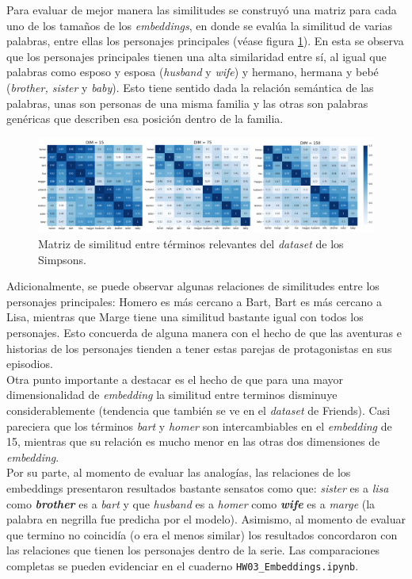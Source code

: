 Para evaluar de mejor manera las similitudes se construyó una matriz para cada uno de los tamaños de los \textit{embeddings}, en donde se evalúa la similitud de varias palabras, entre ellas los personajes principales (véase figura \ref{fig:simpsons_sim_matrix}). En esta se observa que los personajes principales tienen una alta similaridad entre sí, al igual que palabras como esposo y esposa (\textit{husband} y \textit{wife}) y hermano, hermana y bebé (\textit{brother, sister} y \textit{baby}). Esto tiene sentido dada la relación semántica de las palabras, unas son personas de una misma familia y las otras son palabras genéricas que describen esa posición dentro de la familia. 

\begin{figure}[H]
    \centering
    \includegraphics[width=\textwidth]{doc/images/simpsons_sim_matrix.png}
    \caption{Matriz de similitud entre términos relevantes del \textit{dataset} de los Simpsons.}
    \label{fig:simpsons_sim_matrix}
\end{figure}

Adicionalmente, se puede observar algunas relaciones de similitudes entre los personajes principales: Homero es más cercano a Bart, Bart es más cercano a Lisa, mientras que Marge tiene una similitud bastante igual con todos los personajes. Esto concuerda de alguna manera con el hecho de que las aventuras e historias de los personajes tienden a tener estas parejas de protagonistas en sus episodios.  \\

Otra punto importante a destacar es el hecho de que para una mayor dimensionalidad de \textit{embedding} la similitud entre terminos disminuye considerablemente (tendencia que también se ve en el \textit{dataset} de Friends). Casi pareciera que los términos \textit{bart} y \textit{homer} son intercambiables en el \textit{embedding} de 15, mientras que su relación es mucho menor en las otras dos dimensiones de \textit{embedding}. \\

Por su parte, al momento de evaluar las analogías, las relaciones de los embeddings presentaron resultados bastante sensatos como que: \textit{sister} es a \textit{lisa} como \textit{\textbf{brother}} es a \textit{bart} y que \textit{husband} es a \textit{homer} como \textit{\textbf{wife}} es a \textit{marge} (la palabra en negrilla fue predicha por el modelo). Asimismo, al momento de evaluar que termino no coincidía (o era el menos similar) los resultados concordaron con las relaciones que tienen los personajes dentro de la serie. Las comparaciones completas se pueden evidenciar en el cuaderno \texttt{HW03\_Embeddings.ipynb}.

